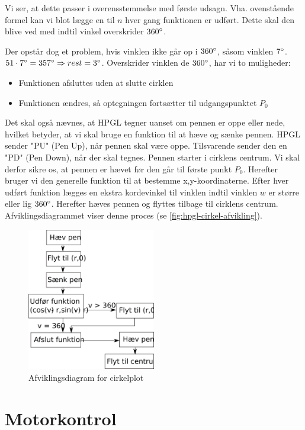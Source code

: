 Vi ser, at dette passer i overensstemmelse med første udsagn. Vha. ovenstående formel kan vi blot lægge en til $n$ hver gang funktionen er udført. Dette skal den blive ved med indtil vinkel overskrider $360^\circ$.


Der opstår dog et problem, hvis vinklen ikke går op i $360^\circ$, såsom vinklen $7^\circ$. $51\cdot 7^\circ = 357^\circ \Rightarrow rest = 3^\circ$. Overskrider vinklen de $360^\circ$, har vi to muligheder:
\begin{itemize} \firmlist
\item Funktionen afsluttes uden at slutte cirklen
\item Funktionen ændres, så optegningen fortsætter til udgangspunktet $P_0$
\end{itemize}
Det skal også nævnes, at HPGL tegner uanset om pennen er oppe eller nede, hvilket betyder, at vi skal bruge en funktion til at hæve og sænke pennen. HPGL sender "PU" (Pen Up), når pennen skal være oppe. Tilsvarende sender den en "PD" (Pen Down), når der skal tegnes. Pennen starter i cirklens centrum. Vi skal derfor sikre os, at pennen er hævet før den går til første punkt $P_0$. Herefter bruger vi den generelle funktion til at bestemme x,y-koordinaterne. Efter hver udført funktion lægges en ekstra kordevinkel til vinklen indtil vinklen $w$ er større eller lig $360^\circ$. Herefter hæves pennen og flyttes tilbage til cirklens centrum. Afviklingsdiagrammet viser denne proces (se \vref{fig:hpgl-cirkel-afvikling}).

\begin{figure}[htbp]
  \centering
  \includegraphics[width=0.5\textwidth]{./img/afviklingsdiagram-cirkel}
  \caption{Afviklingsdiagram for cirkelplot}
  \label{fig:hpgl-cirkel-afvikling}
\end{figure}

\section[Motorkontrol (med buffer)]{Motorkontrol}

